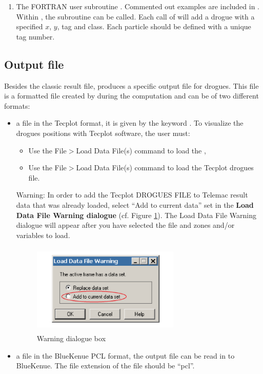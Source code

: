 \begin{enumerate}
\item The FORTRAN user subroutine .
Commented out examples are included in .
Within , the subroutine 
can be called.
Each call of  will add a drogue with a specified
$x$, $y$, tag and class.
Each particle should be defined with a unique tag number.
\end{enumerate}

\subsection{Output file}
\label{subs:drog:output:file}
Besides the classic result file,  produces a specific output file
for drogues.
This file is a formatted file created by  during the computation and
can be of two different formats:

\begin{itemize}
\item  a file in the Tecplot format, it is given by the keyword
.
To visualize the drogues positions with Tecplot software, the user must:

\begin{itemize}
\item Use the File$>$Load Data File(s) command to load the ,

\item Use the File$>$Load Data File(s) command to load the Tecplot drogues file.
\end{itemize}

\begin{WarningBlock}{Warning:}
In order to add the Tecplot DROGUES FILE to Telemac result data that was already
loaded, select ``Add to current data'' set in the
\textbf{Load Data File Warning dialogue} (cf. Figure \ref{fig:load:df}).
The Load Data File Warning dialogue will appear after you have selected the file
and zones and/or variables to load.
\end{WarningBlock}
\begin{figure}[!htbp]
\centering
 \includegraphics[width=2.77in, height=1.70in, keepaspectratio=false]{./graphics/warning1.png}
 \caption{Warning dialogue box}%
 \label{fig:load:df}
\end{figure}
\item a file in the BlueKenue PCL format, the output file can be read
in to BlueKenue.
The file extension of the file should be “pcl”.
\end{itemize}

